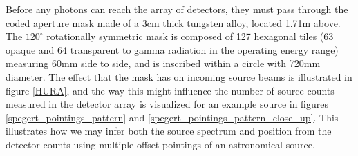 \documentclass{report}
\begin{document}
Before any photons can reach the array of detectors, they must pass through the coded aperture mask made of a 3cm thick tungsten alloy, located 1.71m above. The $120^\circ$ rotationally symmetric mask is composed of 127 hexagonal tiles (63 opaque and 64 transparent to gamma radiation in the operating energy range) measuring 60mm side to side, and is inscribed within a circle with 720mm diameter. The effect that the mask has on incoming source beams is illustrated in figure \ref{HURA}, and the way this might influence the number of source counts measured in the detector array is visualized for an example source in figures \ref{spegert_pointings_pattern} and \ref{spegert_pointings_pattern_close_up}. This illustrates how we may infer both the source spectrum and position from the detector counts using multiple offset pointings of an astronomical source.
\end{document}

